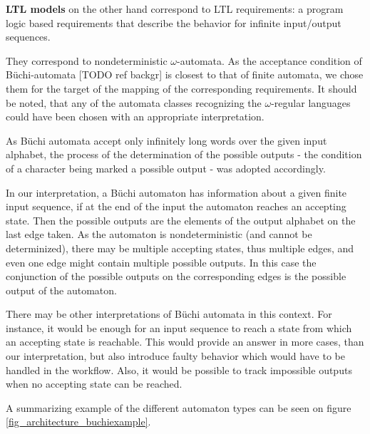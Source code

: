 \textbf{LTL models} on the other hand correspond to LTL requirements: a program logic based requirements that describe the behavior for infinite input/output sequences.%

They correspond to nondeterministic $\omega$-automata. As the acceptance condition of Büchi-automata [TODO ref backgr] is closest to that of finite automata, we chose them for the target of the mapping of the corresponding requirements. It should be noted, that any of the automata classes recognizing the $\omega$-regular languages could have been chosen with an appropriate interpretation.

As Büchi automata accept only infinitely long words over the given input alphabet, the process of the determination of the possible outputs - the condition of a character being marked a possible output - was adopted accordingly.

In our interpretation, a Büchi automaton has information about a given finite input sequence, if at the end of the input the automaton reaches an accepting state. Then the possible outputs are the elements of the output alphabet on the last edge taken. As the automaton is nondeterministic (and cannot be determinized), there may be multiple accepting states, thus multiple edges, and even one edge might contain multiple possible outputs. In this case the conjunction of the possible outputs on the corresponding edges is the possible output of the automaton.  

There may be other interpretations of Büchi automata in this context. For instance, it would be enough for an input sequence to reach a state from which an accepting state is reachable. This would provide an answer in more cases, than our interpretation, but also introduce faulty behavior which would have to be handled in the workflow. Also, it would be possible to track impossible outputs when no accepting state can be reached.

A summarizing example of the different automaton types can be seen on figure \ref{fig_architecture_buchiexample}.


